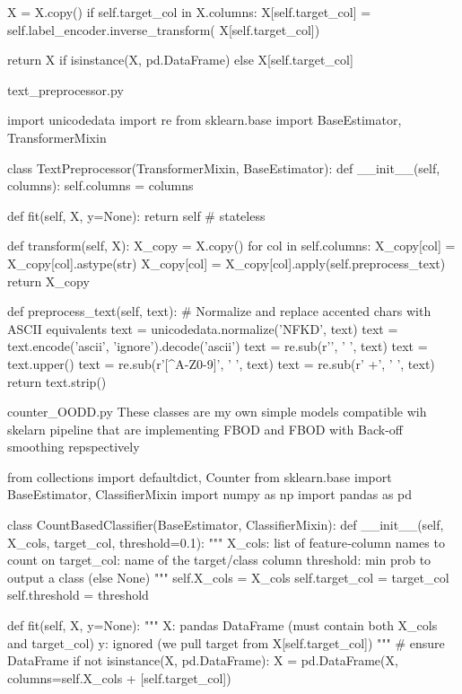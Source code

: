 {{        X = X.copy()
        if self.target_col in X.columns:
            X[self.target_col] = self.label_encoder.inverse_transform(
                X[self.target_col])

        return X if isinstance(X, pd.DataFrame) else X[self.target_col]

\endtt

\sec text_preprocessor.py

\begtt {}
import unicodedata
import re
from sklearn.base import BaseEstimator, TransformerMixin


class TextPreprocessor(TransformerMixin, BaseEstimator):
    def __init__(self, columns):
        self.columns = columns

    def fit(self, X, y=None):
        return self  # stateless

    def transform(self, X):
        X_copy = X.copy()
        for col in self.columns:
            X_copy[col] = X_copy[col].astype(str)
            X_copy[col] = X_copy[col].apply(self.preprocess_text)
        return X_copy

    def preprocess_text(self, text):
        # Normalize and replace accented chars with ASCII equivalents
        text = unicodedata.normalize('NFKD', text)
        text = text.encode('ascii', 'ignore').decode('ascii')
        text = re.sub(r'\s', ' ', text)
        text = text.upper()
        text = re.sub(r'[^A-Z0-9]', ' ', text)
        text = re.sub(r' +', ' ', text)
        return text.strip()
\endtt

\sec counter_OODD.py
These classes are my own simple models compatible wih skelarn pipeline that are implementing FBOD and FBOD with Back-off smoothing repspectively

\begtt {}
from collections import defaultdict, Counter
from sklearn.base import BaseEstimator, ClassifierMixin
import numpy as np
import pandas as pd

class CountBasedClassifier(BaseEstimator, ClassifierMixin):
    def __init__(self, X_cols, target_col, threshold=0.1):
        """
        X_cols: list of feature‐column names to count on
        target_col: name of the target/class column
        threshold: min prob to output a class (else None)
        """
        self.X_cols = X_cols
        self.target_col = target_col
        self.threshold = threshold

    def fit(self, X, y=None):
        """
        X: pandas DataFrame (must contain both X_cols and target_col)
        y: ignored (we pull target from X[self.target_col])
        """
        # ensure DataFrame
        if not isinstance(X, pd.DataFrame):
            X = pd.DataFrame(X, columns=self.X_cols + [self.target_col])

}}
